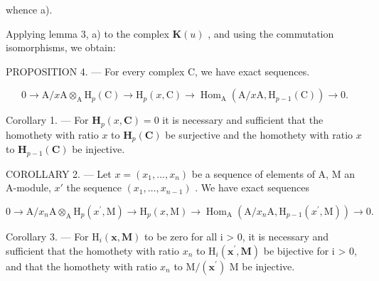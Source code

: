whence a).

Applying lemma 3, a) to the complex \(\mathbf{K}(u)\) , and using the commutation isomorphisms, we obtain:

PROPOSITION 4. --- For every complex C, we have exact sequences.

\[
0 \rightarrow \mathrm{A} / x \mathrm{A} \otimes_ {\mathrm{A}} \mathrm{H} _ {p} (\mathrm{C}) \rightarrow \mathrm{H} _ {p} (x, \mathrm{C}) \rightarrow \operatorname{Hom} _ {\mathrm{A}} (\mathrm{A} / x \mathrm{A}, \mathrm{H} _ {p - 1} (\mathrm{C})) \rightarrow 0.
\]

Corollary 1. --- For \(\mathbf{H}_{p}(x,\mathbf{C})=0\) it is necessary and sufficient that the homothety with ratio \(x\) to \(\mathbf{H}_{p}(\mathbf{C})\) be surjective and the homothety with ratio \(x\) to \(\mathbf{H}_{p-1}(\mathbf{C})\) be injective.

COROLLARY 2. --- Let \(x = (x_1, \ldots, x_n)\) be a sequence of elements of A, M an A-module, \(x'\) the sequence \((x_1, \ldots, x_{n-1})\) . We have exact sequences

\[
0 \rightarrow \mathrm{A} / x _ {n} \mathrm{A} \otimes_ {\mathrm{A}} \mathrm{H} _ {p} (x ^ {\prime}, \mathrm{M}) \rightarrow \mathrm{H} _ {p} (x, \mathrm{M}) \rightarrow \operatorname{Hom} _ {\mathrm{A}} (\mathrm{A} / x _ {n} \mathrm{A}, \mathrm{H} _ {p - 1} (x ^ {\prime}, \mathrm{M})) \rightarrow 0.
\]

Corollary 3. --- For \(\mathrm{H}_{i}(\mathbf{x},\mathbf{M})\) to be zero for all i \textgreater{} 0, it is necessary and sufficient that the homothety with ratio \(x_{n}\) to \(\mathrm{H}_{i}(\mathbf{x}^{\prime},\mathbf{M})\) be bijective for i \textgreater{} 0, and that the homothety with ratio \(x_{n}\) to \(\mathrm{M}/(\mathbf{x}^{\prime})\) M be injective.

